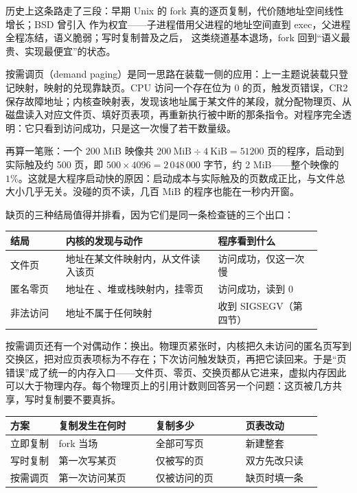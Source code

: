 历史上这条路走了三段：早期 Unix 的 fork 真的逐页复制，代价随地址空间线性增长；BSD 曾引入  作为权宜——子进程借用父进程的地址空间直到 exec，父进程全程冻结，语义脆弱；写时复制普及之后， 这类绕道基本退场，fork 回到“语义最贵、实现最便宜”的状态。

按需调页（demand paging）是同一思路在装载一侧的应用：上一主题说装载只登记映射，映射的兑现靠缺页。CPU 访问一个存在位为 0 的页，触发页错误，CR2 保存故障地址；内核查映射表，发现该地址属于某文件的某段，就分配物理页、从磁盘读入对应文件页、填好页表项，再重新执行被中断的那条指令。对程序完全透明：它只看到访问成功，只是这一次慢了若干数量级。

再算一笔账：一个 200 MiB 映像共 $200\ \text{MiB}\div4\ \text{KiB}=51200$ 页的程序，启动到  实际触及约 500 页，即 $500\times4096=2\,048\,000$ 字节，约 2 MiB——整个映像的 $1\%$。这就是大程序启动快的原因：启动成本与实际触及的页数成正比，与文件总大小几乎无关。没碰的页不读，几百 MiB 的程序也能在一秒内开窗。

缺页的三种结局值得并排看，因为它们是同一条检查链的三个出口：

\begin{longtable}{L{0.16\linewidth}L{0.44\linewidth}L{0.30\linewidth}}
\toprule
结局 & 内核的发现与动作 & 程序看到什么 \\
\midrule
文件页 & 地址在某文件映射内，从文件读入该页 & 访问成功，仅这一次慢 \\
匿名零页 & 地址在 、堆或栈映射内，挂零页 & 访问成功，读到 0 \\
非法访问 & 地址不属于任何映射 & 收到 SIGSEGV（第四节） \\
\bottomrule
\end{longtable}

按需调页还有一个对偶动作：换出。物理页紧张时，内核把久未访问的匿名页写到交换区，把对应页表项标为不存在；下次访问触发缺页，再把它读回来。于是“页错误”成了统一的内存入口——文件页、零页、交换页都从它进来，虚拟内存因此可以大于物理内存。每个物理页上的引用计数则回答另一个问题：这页被几方共享，写时复制要不要真拆。

\begin{longtable}{L{0.14\linewidth}L{0.28\linewidth}L{0.26\linewidth}L{0.22\linewidth}}
\toprule
方案 & 复制发生在何时 & 复制多少 & 页表改动 \\
\midrule
立即复制 & fork 当场 & 全部可写页 & 新建整套 \\
写时复制 & 第一次写某页 & 仅被写的页 & 双方先改只读 \\
按需调页 & 第一次访问某页 & 仅被访问的页 & 缺页时填一条 \\
\bottomrule
\end{longtable}

